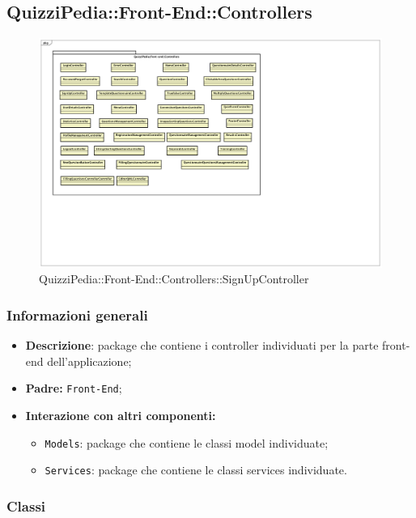 \newpage
\subsection{QuizziPedia::Front-End::Controllers}


\begin{figure}
	\centering
	\includegraphics[scale=0.45]{UML/Package/QuizziPedia_Front-End_Controllers.png}
	\caption{QuizziPedia::Front-End::Controllers::SignUpController}
\end{figure}

\subsubsection{Informazioni generali}
\begin{itemize}
	\item \textbf{Descrizione}: package che contiene i controller individuati per la parte front-end dell'applicazione;
	\item \textbf{Padre:} \texttt{Front-End};
	\item \textbf{Interazione con altri componenti:}
	\begin{itemize}
		\item \texttt{Models}: package che contiene le classi model individuate;
		\item \texttt{Services}: package che contiene le classi services individuate.
	\end{itemize} 
\end{itemize}
\subsubsection{Classi}

